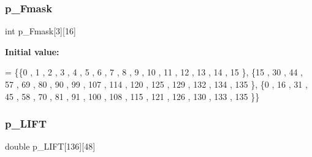 \subsubsection{\texorpdfstring{p\+\_\+\+Fmask}{p\_Fmask}}
{\footnotesize\ttfamily int p\+\_\+\+Fmask\mbox{[}3\mbox{]}\mbox{[}16\mbox{]}}

{\bfseries Initial value\+:}
\begin{DoxyCode}
= \{\{0 , 1 , 2 , 3 , 4 , 5 , 6 , 7 , 8 , 9 , 10 , 11 , 12 , 13 , 14 , 15 \},
\{15 , 30 , 44 , 57 , 69 , 80 , 90 , 99 , 107 , 114 , 120 , 125 , 129 , 132 , 134 , 135 \},
\{0 , 16 , 31 , 45 , 58 , 70 , 81 , 91 , 100 , 108 , 115 , 121 , 126 , 130 , 133 , 135 \}\}
\end{DoxyCode}
\mbox{\label{a00548_a950a98d495246620d1d1520409c24c20}} 
\subsubsection{\texorpdfstring{p\+\_\+\+L\+I\+FT}{p\_LIFT}}
{\footnotesize\ttfamily double p\+\_\+\+L\+I\+FT\mbox{[}136\mbox{]}\mbox{[}48\mbox{]}}

\mbox{\label{a00548_ac40b6d7cb8ff8244e4b9bfb7a85ef198}} 

